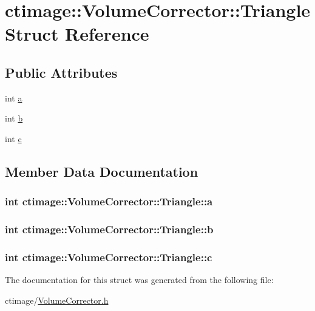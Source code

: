 \hypertarget{structctimage_1_1_volume_corrector_1_1_triangle}{
\section{ctimage::VolumeCorrector::Triangle Struct Reference}
\label{structctimage_1_1_volume_corrector_1_1_triangle}
}
\subsection*{Public Attributes}
\begin{DoxyCompactItemize}
\item 
int \hyperlink{structctimage_1_1_volume_corrector_1_1_triangle_a6f64dfd916ca2196adb54d136d374cdd}{a}
\item 
int \hyperlink{structctimage_1_1_volume_corrector_1_1_triangle_a3c0798337f8cc3e94efa1128475b7600}{b}
\item 
int \hyperlink{structctimage_1_1_volume_corrector_1_1_triangle_a2cf51da301b925abdd0233330fe29e8a}{c}
\end{DoxyCompactItemize}


\subsection{Member Data Documentation}
\hypertarget{structctimage_1_1_volume_corrector_1_1_triangle_a6f64dfd916ca2196adb54d136d374cdd}{
\subsubsection[{a}]{\setlength{\rightskip}{0pt plus 5cm}int {\bf ctimage::VolumeCorrector::Triangle::a}}}
\label{structctimage_1_1_volume_corrector_1_1_triangle_a6f64dfd916ca2196adb54d136d374cdd}
\hypertarget{structctimage_1_1_volume_corrector_1_1_triangle_a3c0798337f8cc3e94efa1128475b7600}{
\subsubsection[{b}]{\setlength{\rightskip}{0pt plus 5cm}int {\bf ctimage::VolumeCorrector::Triangle::b}}}
\label{structctimage_1_1_volume_corrector_1_1_triangle_a3c0798337f8cc3e94efa1128475b7600}
\hypertarget{structctimage_1_1_volume_corrector_1_1_triangle_a2cf51da301b925abdd0233330fe29e8a}{
\subsubsection[{c}]{\setlength{\rightskip}{0pt plus 5cm}int {\bf ctimage::VolumeCorrector::Triangle::c}}}
\label{structctimage_1_1_volume_corrector_1_1_triangle_a2cf51da301b925abdd0233330fe29e8a}


The documentation for this struct was generated from the following file:\begin{DoxyCompactItemize}
\item 
ctimage/\hyperlink{_volume_corrector_8h}{VolumeCorrector.h}\end{DoxyCompactItemize}
